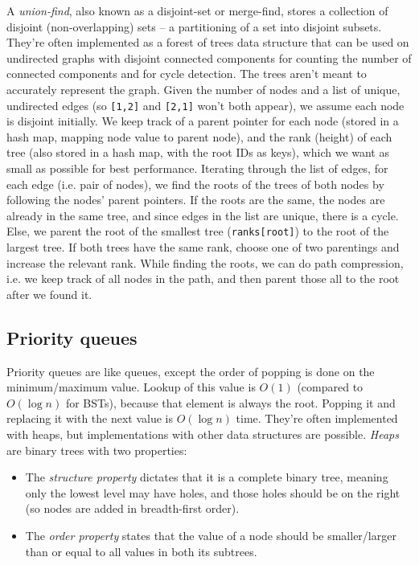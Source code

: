 \documentclass[8pt, table, xcdraw]{article}%
\begin{document}
A \emph{union-find}, also known as a disjoint-set or merge-find, stores a collection of disjoint (non-overlapping) sets -- a partitioning of a set into disjoint subsets. They're often implemented as a forest of trees data structure that can be used on undirected graphs with disjoint connected components for counting the number of connected components and for cycle detection. The trees aren't meant to accurately represent the graph. Given the number of nodes and a list of unique, undirected edges (so \lstinline{[1,2]} and \lstinline{[2,1]} won't both appear), we assume each node is disjoint initially. We keep track of a parent pointer for each node (stored in a hash map, mapping node value to parent node), and the rank (height) of each tree (also stored in a hash map, with the root IDs as keys), which we want as small as possible for best performance. Iterating through the list of edges, for each edge (i.e. pair of nodes), we find the roots of the trees of both nodes by following the nodes' parent pointers. If the roots are the same, the nodes are already in the same tree, and since edges in the list are unique, there is a cycle. Else, we parent the root of the smallest tree (\lstinline{ranks[root]}) to the root of the largest tree. If both trees have the same rank, choose one of two parentings and increase the relevant rank. While finding the roots, we can do path compression, i.e. we keep track of all nodes in the path, and then parent those all to the root after we found it.

\subsection{Priority queues}

Priority queues are like queues, except the order of popping is done on the minimum/maximum value. Lookup of this value is $O(1)$ (compared to $O(\log n)$ for BSTs), because that element is always the root. Popping it and replacing it with the next value is $O(\log n)$ time. They're often implemented with heaps, but implementations with other data structures are possible. \emph{Heaps} are binary trees with two properties:

\begin{itemize}
    \item The \emph{structure property} dictates that it is a complete binary tree, meaning only the lowest level may have holes, and those holes should be on the right (so nodes are added in breadth-first order).
    \item The \emph{order property} states that the value of a node should be smaller/larger than or equal to all values in both its subtrees.
\end{itemize}
\end{document}
